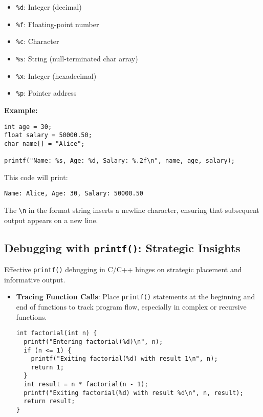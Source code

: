 \documentclass{article}
\begin{document}
{{{{\begin{itemize}
\item \texttt{\%d}:  Integer (decimal)
\item \texttt{\%f}:  Floating-point number
\item \texttt{\%c}:  Character
\item \texttt{\%s}:  String (null-terminated char array)
\item \texttt{\%x}:  Integer (hexadecimal)
\item \texttt{\%p}:  Pointer address
\end{itemize}

\textbf{Example:}

\begin{verbatim}
int age = 30;
float salary = 50000.50;
char name[] = "Alice";

printf("Name: %s, Age: %d, Salary: %.2f\n", name, age, salary);
\end{verbatim}

This code will print:

\begin{verbatim}
Name: Alice, Age: 30, Salary: 50000.50
\end{verbatim}

The \texttt{\textbackslash n} in the format string inserts a newline character, ensuring that subsequent output appears on a new line.

\subsection*{Debugging with \texttt{printf()}: Strategic Insights}

Effective \texttt{printf()} debugging in C/C++ hinges on strategic placement and informative output.

\begin{itemize}
\item \textbf{Tracing Function Calls}: Place \texttt{printf()} statements at the beginning and end of functions to track program flow, especially in complex or recursive functions.

\begin{verbatim}
int factorial(int n) {
  printf("Entering factorial(%d)\n", n);
  if (n <= 1) {
    printf("Exiting factorial(%d) with result 1\n", n);
    return 1;
  }
  int result = n * factorial(n - 1);
  printf("Exiting factorial(%d) with result %d\n", n, result);
  return result;
}
\end{verbatim}


\end{itemize}}}}}
\end{document}

